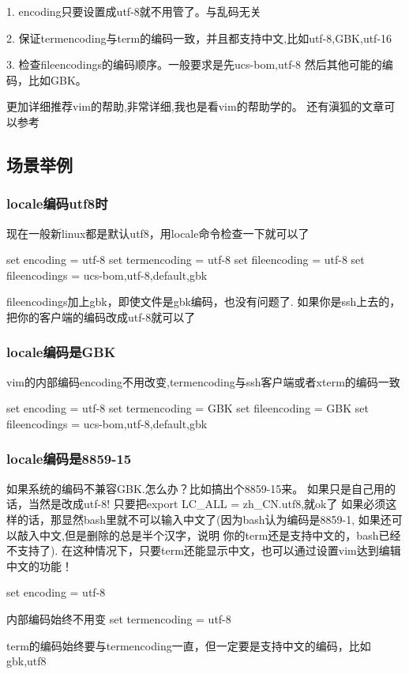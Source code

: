 \documentclass[adobefonts]{ctexart}
\begin{document}
1. encoding只要设置成utf-8就不用管了。与乱码无关

2. 保证termencoding与term的编码一致，并且都支持中文,比如utf-8,GBK,utf-16

3. 检查fileencodings的编码顺序。一般要求是先ucs-bom,utf-8 然后其他可能的编码，比如GBK。


更加详细推荐vim的帮助,非常详细,我也是看vim的帮助学的。
还有滇狐的文章可以参考



\subsection{场景举例}
\subsubsection{locale编码utf8时}
现在一般新linux都是默认utf8，用locale命令检查一下就可以了

set encoding = utf-8
set termencoding = utf-8
set fileencoding = utf-8
set fileencodings = ucs-bom,utf-8,default,gbk

fileencodings加上gbk，即使文件是gbk编码，也没有问题了.
如果你是ssh上去的，把你的客户端的编码改成utf-8就可以了

\subsubsection{locale编码是GBK}
vim的内部编码encoding不用改变,termencoding与ssh客户端或者xterm的编码一致

set encoding = utf-8
set termencoding = GBK
set fileencoding = GBK
set fileencodings = ucs-bom,utf-8,default,gbk

\subsubsection{locale编码是8859-15}
如果系统的编码不兼容GBK.怎么办？比如搞出个8859-15来。
如果只是自己用的话，当然是改成utf-8! 只要把export LC\_ALL = zh\_CN.utf8,就ok了
如果必须这样的话，那显然bash里就不可以输入中文了(因为bash认为编码是8859-1, 如果还可以敲入中文,但是删除的总是半个汉字，说明
你的term还是支持中文的，bash已经不支持了). 在这种情况下，只要term还能显示中文，也可以通过设置vim达到编辑中文的功能！

set encoding = utf-8

内部编码始终不用变
set termencoding = utf-8

term的编码始终要与termencoding一直，但一定要是支持中文的编码，比如gbk,utf8 
\end{document}
